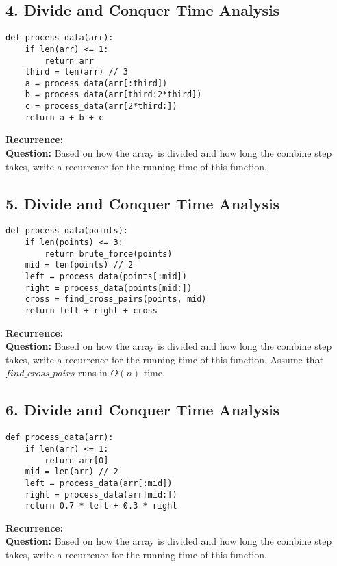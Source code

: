 \documentclass[12pt]{article}
\begin{document}
\vspace{2em}

\subsection*{4. Divide and Conquer Time Analysis}
\begin{lstlisting}
def process_data(arr):
    if len(arr) <= 1:
        return arr
    third = len(arr) // 3
    a = process_data(arr[:third])
    b = process_data(arr[third:2*third])
    c = process_data(arr[2*third:])
    return a + b + c
\end{lstlisting}
\textbf{Recurrence:} \underline{\hspace{10cm}} \\
\textbf{Question:} Based on how the array is divided and how long the combine step takes, write a recurrence for the running time of this function.

\vspace{2em}

\subsection*{5. Divide and Conquer Time Analysis}
\begin{lstlisting}
def process_data(points):
    if len(points) <= 3:
        return brute_force(points)
    mid = len(points) // 2
    left = process_data(points[:mid])
    right = process_data(points[mid:])
    cross = find_cross_pairs(points, mid)
    return left + right + cross
\end{lstlisting}
\textbf{Recurrence:} \underline{\hspace{10cm}} \\
\textbf{Question:} Based on how the array is divided and how long the combine step takes, write a recurrence for the running time of this function. Assume that $find\_cross\_pairs$ runs in $O(n)$ time.

\vspace{2em}

\subsection*{6. Divide and Conquer Time Analysis}
\begin{lstlisting}
def process_data(arr):
    if len(arr) <= 1:
        return arr[0]
    mid = len(arr) // 2
    left = process_data(arr[:mid])
    right = process_data(arr[mid:])
    return 0.7 * left + 0.3 * right
\end{lstlisting}
\textbf{Recurrence:} \underline{\hspace{10cm}} \\
\textbf{Question:} Based on how the array is divided and how long the combine step takes, write a recurrence for the running time of this function.
\end{document}
